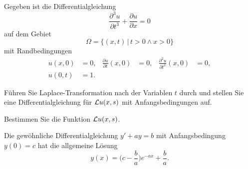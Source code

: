Gegeben ist die Differentialgleichung
\begin{equation}
\frac{\partial^3 u}{\partial t^3}
+
\frac{\partial u}{\partial x}
=
0
\label{50000013:dgl}
\end{equation}
auf dem Gebiet
\[
\Omega = \{ (x,t)\,|\, t>0\wedge x > 0\}
\]
mit Randbedingungen
\begin{equation}
\begin{aligned}
u(x,0)&=0,
&
\frac{\partial u}{\partial t}(x,0)
&=
0,
&
\frac{\partial^2 u}{\partial t^2}(x,0)
&=0,
\\
u(0,t)&=1.
\end{aligned}
\end{equation}
\begin{teilaufgaben}
\item
Führen Sie Laplace-Transformation nach der Variablen $t$ durch und
stellen Sie eine Differentialgleichung für ${\cal L}u(x,s)$ mit
Anfangsbedingungen auf.
\item
Bestimmen Sie die Funktion ${\cal L}u(x,s)$.
\end{teilaufgaben}

\begin{hinweis}
Die gewöhnliche Differentialgleichung $y'+ay=b$ mit Anfangsbedingung $y(0)=c$
hat die allgemeine Lösung
\[
y(x) = \biggl(c-\frac{b}{a}\biggr)e^{-ax} + \frac{b}{a}.
\]
\end{hinweis}

